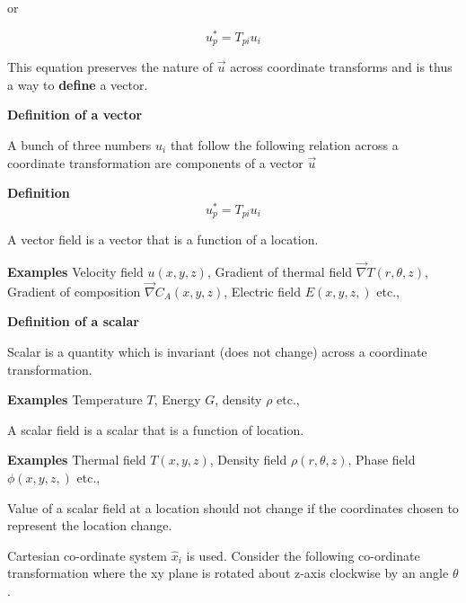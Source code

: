 or

$$ u^*_p = T_{pi} u_i $$

This equation preserves the nature of $\vec{u}$ across coordinate transforms and is thus a way to {\bf define} a vector.



{\bf Definition of a vector}

A bunch of three numbers $u_i$ that follow the following relation across a coordinate transformation are components of a vector $\vec{u}$

{\bf Definition}
$$ u^*_p = T_{pi} u_i $$

A vector field is a vector that is a function of a location. 

{\bf Examples}
Velocity field $u\left(x,y,z\right)$, Gradient of thermal field $\vec{\nabla}T\left(r,\theta,z\right)$, Gradient of composition $\vec{\nabla}C_A\left(x,y,z\right)$, Electric field $E\left(x,y,z,\right)$ etc.,



{\bf Definition of a scalar}

Scalar is a quantity which is invariant (does not change) across a coordinate transformation.

{\bf Examples}
Temperature $T$, Energy $G$, density $\rho$ etc.,

A scalar field is a scalar that is a function of location. 

{\bf Examples}
Thermal field $T\left(x,y,z\right)$, Density field $\rho\left(r,\theta,z\right)$, Phase field $\phi\left(x,y,z,\right)$ etc.,

Value of a scalar field at a location should not change if the coordinates chosen to represent the location change.



Cartesian co-ordinate system $\hat{x}_i$ is used. Consider the following co-ordinate transformation where the xy plane is rotated about z-axis clockwise by an angle $\theta$. 
\vspace{1cm}




